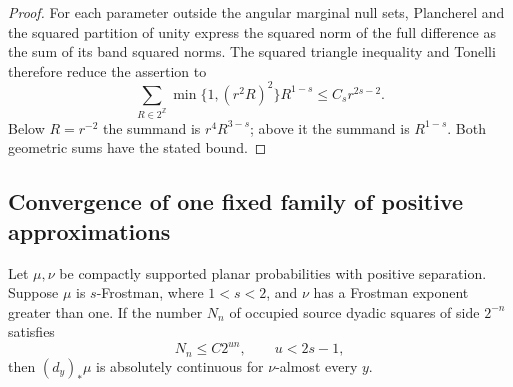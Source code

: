 \begin{proof}
For each parameter outside the angular marginal null sets, Plancherel
and the squared partition of unity express the squared norm of the
full difference as the sum of its band squared norms. The squared
triangle inequality and Tonelli therefore reduce the assertion to
\[
 \sum_{R\in2^{\mathbb Z}}\min\{1,(r^2R)^2\}R^{1-s}
 \le C_s r^{2s-2}.
\]
Below \(R=r^{-2}\) the summand is \(r^4R^{3-s}\); above it the
summand is \(R^{1-s}\). Both geometric sums have the stated bound.
\end{proof}

\subsection{Convergence of one fixed family of positive approximations}

\begin{proposition}\label{human:coherent-measure}
Let \(\mu,\nu\) be compactly supported planar probabilities with
positive separation. Suppose \(\mu\) is \(s\)-Frostman, where
\(1<s<2\), and \(\nu\) has a Frostman exponent greater than one.
If the number \(N_n\) of occupied source dyadic squares of side
\(2^{-n}\) satisfies
\begin{equation}\label{human:covering-bound}
 N_n\le C2^{un},\qquad u<2s-1,
\end{equation}
then \((d_y)_*\mu\) is absolutely continuous for
\(\nu\)-almost every \(y\).
\end{proposition}

